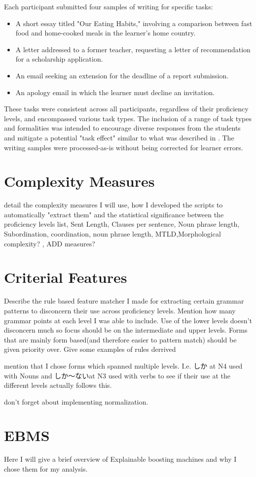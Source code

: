 Each participant submitted four samples of writing for specific tasks:
\begin{itemize}
    \item A short essay titled "Our Eating Habits," involving a comparison between fast food and home-cooked meals in the learner's home country.
    \item A letter addressed to a former teacher, requesting a letter of recommendation for a scholarship application.
    \item An email seeking an extension for the deadline of a report submission.
    \item An apology email in which the learner must decline an invitation.
\end{itemize}
These tasks were consistent across all participants, regardless of their proficiency levels, and encompassed various task types. The inclusion of a range of task types and formalities was intended to encourage diverse responses from the students and mitigate a potential "task effect" similar to what  was described in \cite{Alexpoulou2017}. The writing samples were processed-as-is without being corrected for learner errors.

\section{Complexity Measures}
detail the complexity measures I will use, how I developed the scripts to automatically "extract them" and the statistical significance between the proficiency levels
list, Sent Length, Clauses per sentence, Noun phrase length,  Subordination, coordination, noun phrase length, MTLD,Morphological complexity? , ADD measures?

\section{Criterial Features}
Describe the rule based feature matcher I made for extracting certain grammar patterns to disconcern their use
across proficiency levels. Mention how many grammar points at each level I was able to include. Use of the lower
levels doesn't disconcern much so focus should be on the intermediate and upper levels.  Forms that are mainly form
based(and therefore easier to pattern match) should be given priority over. Give some examples of rules derrived

mention that I chose forms which spanned multiple levels. I.e. しか at N4 used with Nouns and しか〜ないat N3 used
with verbs to see if their use at the different levels actually follows this.

don't forget about implementing normalization.

\section{EBMS}
 Here I will give a brief overview of Explainable boosting machines and why I chose them for my analysis.


